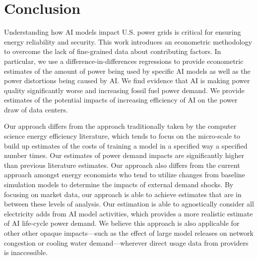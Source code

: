 \documentclass[sigconf,authordraft]{acmart}
\begin{document}
\section{Conclusion}

Understanding how AI models impact U.S. power grids is critical for ensuring energy reliability and security. This work introduces an econometric methodology to overcome the lack of fine-grained data about contributing factors. In particular, we use a difference-in-differences regressions to provide econometric estimates of the amount of power being used by specific AI models as well as the power distortions being caused by AI. We find evidence that AI is making power quality significantly worse and increasing fossil fuel power demand. We provide estimates of the potential impacts of increasing efficiency of AI on the power draw of data centers.

Our approach differs from the approach traditionally taken by the computer science energy efficiency literature, which tends to focus on the micro-scale to build up estimates of the costs of training a model in a specified way a specified number times. Our estimates of power demand impacts are significantly higher than previous literature estimates. Our approach also differs from the current approach amongst energy economists who tend to utilize changes from baseline simulation models to determine the impacts of external demand shocks. By focusing on market data, our approach is able to achieve estimates that are in between these levels of analysis. Our estimation is able to agnostically consider all electricity adds from AI model activities, which provides a more realistic estimate of AI life-cycle power demand. We believe this approach is also applicable for other other opaque impacts—such as the effect of large model releases on network congestion or cooling water demand—wherever direct usage data from providers is inaccessible.



\end{document}
